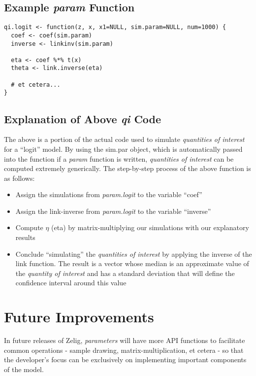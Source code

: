 \documentclass[a4paper,11pt]{article}
\begin{document}
\subsection{Example \emph{param} Function}

\begin{verbatim}
qi.logit <- function(z, x, x1=NULL, sim.param=NULL, num=1000) {
  coef <- coef(sim.param)
  inverse <- linkinv(sim.param)

  eta <- coef %*% t(x)
  theta <- link.inverse(eta)

  # et cetera...
}

\end{verbatim}


\subsection{Explanation of Above \emph{qi} Code}

The above is a portion of the actual code used to simulate \emph{quantities of interest} for a ``logit'' model.  By using the sim.par object, which is automatically passed into the function if a \emph{param} function is written, \emph{quantities of interest} can be computed extremely generically.  The step-by-step process of the above function is as follows:

\begin{itemize}
	\item{Assign the simulations from \emph{param.logit} to the variable ``coef''}
	\item{Assign the link-inverse from \emph{param.logit} to the variable ``inverse''}
	\item{Compute $\eta$ (eta) by matrix-multiplying our simulations with our explanatory results}
	\item{Conclude ``simulating'' the \emph{quantities of interest} by applying the inverse of the link function.  The result is a vector whose median is an approximate value of the \emph{quantity of interest} and has a standard deviation that will define the confidence interval around this value}
	
\end{itemize}


\section{Future Improvements}

In future releases of Zelig, \emph{parameters} will have more API functions to facilitate common operations - sample drawing, matrix-multiplication, et cetera - so that the developer's focus can be exclusively on implementing important components of the model.
\end{document}
